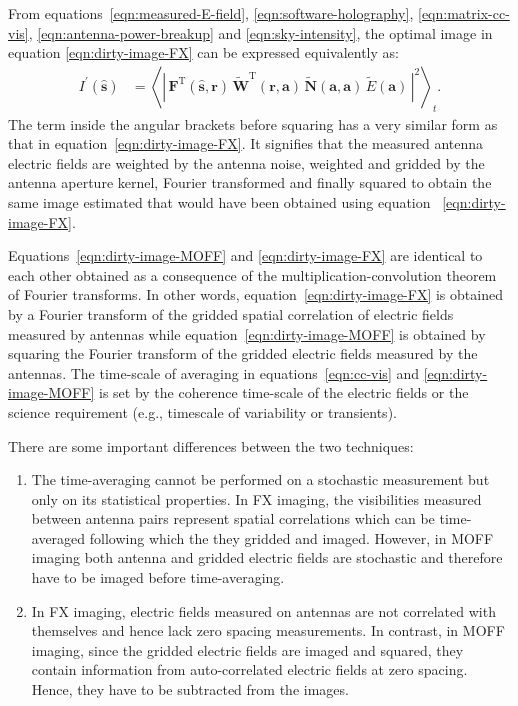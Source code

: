 \documentclass[a4paper,fleqn,usenatbib]{../mnras}
\begin{document}
From equations~\ref{eqn:measured-E-field}, \ref{eqn:software-holography},
\ref{eqn:matrix-cc-vis}, \ref{eqn:antenna-power-breakup} and
\ref{eqn:sky-intensity}, the optimal image in equation \ref{eqn:dirty-image-FX}
can be expressed equivalently as:
\begin{align}
  I^\prime(\hat{\mathbf{s}}) &= \left\langle \left|\,\mathbf{F}^\textrm{T}(\hat{\mathbf{s}},\mathbf{r})\,\widetilde{\mathbf{W}}^\textrm{T}(\mathbf{r},\mathbf{a})\,\widetilde{\mathbf{N}}(\mathbf{a},\mathbf{a})\,\widetilde{E}(\mathbf{a})\,\right|^2\right\rangle_t. \label{eqn:dirty-image-MOFF}
\end{align}
The term inside the angular brackets before squaring has a very similar form as
that in equation~\ref{eqn:dirty-image-FX}. It signifies that the measured antenna
electric fields are weighted by the antenna noise, weighted and gridded by the
antenna aperture kernel, Fourier transformed and finally squared to obtain the
same image estimated that would have been obtained using equation~
\ref{eqn:dirty-image-FX}. 

Equations~\ref{eqn:dirty-image-MOFF} and \ref{eqn:dirty-image-FX} are identical
to each other obtained as a consequence of the multiplication-convolution theorem
of Fourier transforms. In other words, equation~\ref{eqn:dirty-image-FX} is
obtained by a Fourier transform of the gridded spatial correlation of electric
fields measured by antennas while equation~\ref{eqn:dirty-image-MOFF} is obtained
by squaring the Fourier transform of the gridded electric fields measured by the
antennas. The time-scale of averaging in equations~\ref{eqn:cc-vis} and
\ref{eqn:dirty-image-MOFF} is set by the coherence time-scale of the electric
fields or the science requirement (e.g., timescale of variability or transients).

There are some important differences between the two techniques:
\begin{enumerate}
\item The time-averaging cannot be performed on a stochastic measurement but
  only on its statistical properties. In FX imaging, the visibilities measured
  between antenna pairs represent spatial correlations which can be time-averaged
  following which the they gridded and imaged. However, in MOFF imaging both
  antenna and gridded electric fields are stochastic and therefore have to be
  imaged before time-averaging. 
\item In FX imaging, electric fields measured on antennas are not correlated with
  themselves and hence lack zero spacing measurements. In contrast, in MOFF
  imaging, since the gridded electric fields are imaged and squared, they
  contain information from auto-correlated electric fields at zero spacing.
  Hence, they have to be subtracted from the images.
\end{enumerate} 
\end{document}

